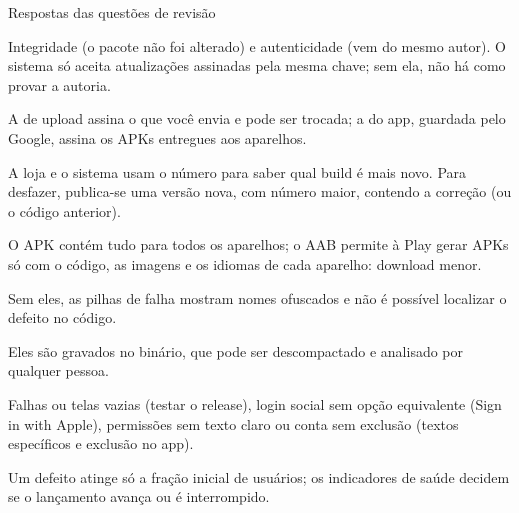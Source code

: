\documentclass[aspectratio=169,10pt]{beamer}
\begin{document}
\begin{frame}{Respostas das questões de revisão}
  \begin{respostas}
    \item Integridade (o pacote não foi alterado) e autenticidade (vem do mesmo autor). O sistema só aceita atualizações assinadas pela mesma chave; sem ela, não há como provar a autoria.
    \item A de upload assina o que você envia e pode ser trocada; a do app, guardada pelo Google, assina os APKs entregues aos aparelhos.
    \item A loja e o sistema usam o número para saber qual build é mais novo. Para desfazer, publica-se uma versão nova, com número maior, contendo a correção (ou o código anterior).
    \item O APK contém tudo para todos os aparelhos; o AAB permite à Play gerar APKs só com o código, as imagens e os idiomas de cada aparelho: download menor.
    \item Sem eles, as pilhas de falha mostram nomes ofuscados e não é possível localizar o defeito no código.
    \item Eles são gravados no binário, que pode ser descompactado e analisado por qualquer pessoa.
    \item Falhas ou telas vazias (testar o release), login social sem opção equivalente (Sign in with Apple), permissões sem texto claro ou conta sem exclusão (textos específicos e exclusão no app).
    \item Um defeito atinge só a fração inicial de usuários; os indicadores de saúde decidem se o lançamento avança ou é interrompido.
  \end{respostas}
\end{frame}

\end{document}
